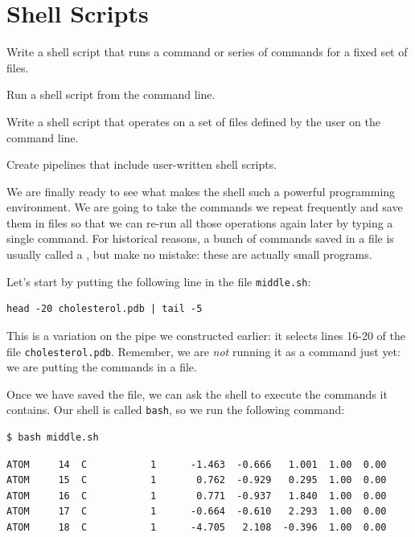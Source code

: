 \documentclass{book}
\begin{document}
\section{Shell Scripts}

\begin{objectives}
\begin{swcitemize}
\item
  Write a shell script that runs a command or series of commands for a
  fixed set of files.
\item
  Run a shell script from the command line.
\item
  Write a shell script that operates on a set of files defined by the
  user on the command line.
\item
  Create pipelines that include user-written shell scripts.
\end{swcitemize}
\end{objectives}

We are finally ready to see what makes the shell such a powerful
programming environment. We are going to take the commands we repeat
frequently and save them in files so that we can re-run all those
operations again later by typing a single command. For historical
reasons, a bunch of commands saved in a file is usually called a
, but make no mistake: these are
actually small programs.

Let's start by putting the following line in the file
\texttt{middle.sh}:

\begin{verbatim}
head -20 cholesterol.pdb | tail -5
\end{verbatim}

This is a variation on the pipe we constructed earlier: it selects lines
16-20 of the file \texttt{cholesterol.pdb}. Remember, we are \emph{not}
running it as a command just yet: we are putting the commands in a file.

Once we have saved the file, we can ask the shell to execute the
commands it contains. Our shell is called \texttt{bash}, so we run the
following command:

\begin{verbatim}
$ bash middle.sh
\end{verbatim}

\begin{verbatim}
ATOM     14  C           1      -1.463  -0.666   1.001  1.00  0.00
ATOM     15  C           1       0.762  -0.929   0.295  1.00  0.00
ATOM     16  C           1       0.771  -0.937   1.840  1.00  0.00
ATOM     17  C           1      -0.664  -0.610   2.293  1.00  0.00
ATOM     18  C           1      -4.705   2.108  -0.396  1.00  0.00
\end{verbatim}
\end{document}
